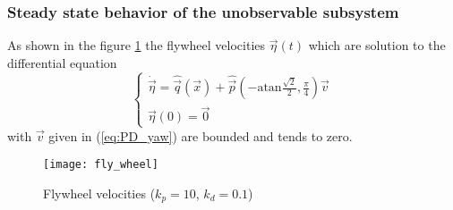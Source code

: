 \subsubsection{Steady state behavior of the unobservable subsystem}
As shown in the figure \ref{fig:fw_velocites} the
flywheel velocities $\vec{\eta}(t)$ which are solution to the differential
equation
\[
\begin{cases}
\dot{\vec{\eta}} = \hat{\vec{q}}(\vec{x}) + \hat{\vec{p}}\left(-\mathrm{atan}\frac{\sqrt{2}}{2},\frac{\pi}{4}\right)\vec{v}\\
\vec{\eta}(0) = \vec{0}
\end{cases}
\]
with $\vec{v}$ given in (\ref{eq:PD_yaw}) are bounded and tends to zero.
\begin{figure}[h]
  \centering
  \texttt{[image: fly\_wheel]}
  \caption{Flywheel velocities ($k_p = 10$, $k_d = 0.1$)\label{fig:fw_velocites}}
\end{figure}

